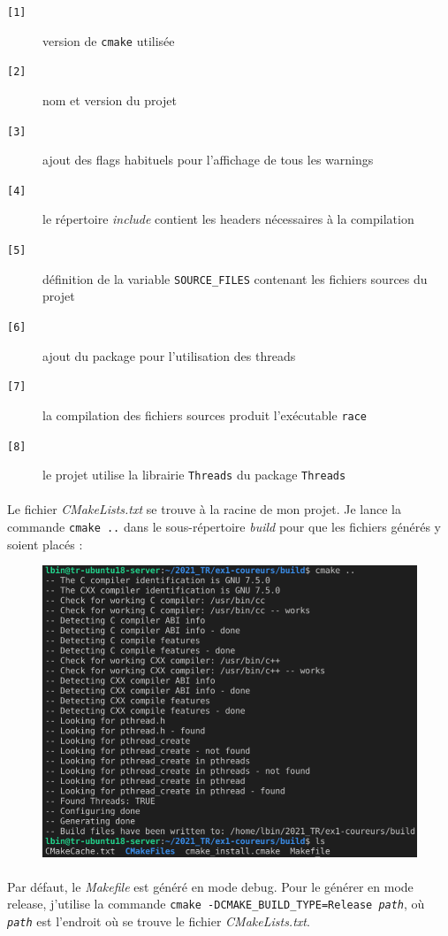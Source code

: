 \documentclass{article}
\begin{document}
    \begin{description}
        \item[\texttt{[1]}] version de \texttt{cmake} utilisée
        \item[\texttt{[2]}] nom et version du projet
        \item[\texttt{[3]}] ajout des flags habituels pour l'affichage de tous les warnings
        \item[\texttt{[4]}] le répertoire \emph{include} contient les headers nécessaires à la compilation
        \item[\texttt{[5]}] définition de la variable \texttt{SOURCE\_FILES} contenant les fichiers sources du projet
        \item[\texttt{[6]}] ajout du package pour l'utilisation des threads
        \item[\texttt{[7]}] la compilation des fichiers sources produit l'exécutable \texttt{race} 
        \item[\texttt{[8]}] le projet utilise la librairie \texttt{Threads} du package \texttt{Threads}
    \end{description}

    \newpage
    \paragraph{}
    Le fichier \emph{CMakeLists.txt} se trouve à la racine de mon projet. Je lance la commande \texttt{cmake ..} dans le sous-répertoire \emph{build} pour que les fichiers générés y soient placés :
    \begin{figure}[H]
        \centering
        \includegraphics[width=.7\textwidth]{./screenshots/cmake.png}
    \end{figure}

    \paragraph{}
    Par défaut, le \emph{Makefile} est généré en mode debug. Pour le générer en mode release, j'utilise la commande \texttt{cmake -DCMAKE\_BUILD\_TYPE=Release \emph{path}}, où \texttt{\emph{path}} est l'endroit où se trouve le fichier \emph{CMakeLists.txt}.
    
\end{document}
